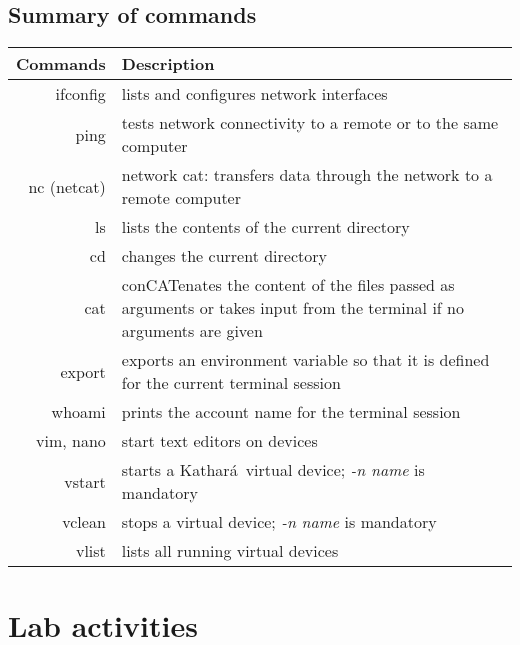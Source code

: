 \documentclass[12pt]{book}
\newcommand{\kathara}{Kathar\'a}
\begin{document}
\subsection{Summary of commands}

\begin{tabularx}{\textwidth}{r  X}
  Commands & Description \\ \midrule
  ifconfig & lists and configures network interfaces \\
  ping & tests network connectivity to a remote or to the same computer \\
  nc (netcat) & network cat: transfers data through the network to a remote computer \\ \midrule

  ls & lists the contents of the current directory \\
  cd & changes the current directory \\
  cat & conCATenates the content of the files passed as arguments or takes input from the terminal if no arguments are given \\
  export & exports an environment variable so that it is defined for the current terminal session \\
  whoami & prints the account name for the terminal session\\
  vim, nano & start text editors on devices \\ \midrule
  vstart & starts a \kathara\ virtual device; \emph{-n name} is mandatory \\
  vclean & stops a virtual device;  \emph{-n name} is mandatory \\
  vlist & lists all running virtual devices \\
\end{tabularx}



\section{Lab activities}
\end{document}
